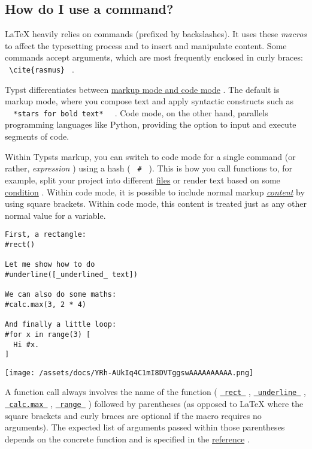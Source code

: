 \subsection{How do I use a command?}\label{commands}

LaTeX heavily relies on commands (prefixed by backslashes). It uses
these \emph{macros} to affect the typesetting process and to insert and
manipulate content. Some commands accept arguments, which are most
frequently enclosed in curly braces:
\texttt{\ \textbackslash{}cite\{rasmus\}\ } .

Typst differentiates between
\href{/docs/reference/scripting/\#blocks}{markup mode and code mode} .
The default is markup mode, where you compose text and apply syntactic
constructs such as
\texttt{\ }{\texttt{\ *stars\ for\ bold\ text*\ }}\texttt{\ } . Code
mode, on the other hand, parallels programming languages like Python,
providing the option to input and execute segments of code.

Within Typst\textquotesingle s markup, you can switch to code mode for a
single command (or rather, \emph{expression} ) using a hash (
\texttt{\ \#\ } ). This is how you call functions to, for example, split
your project into different
\href{/docs/reference/scripting/\#modules}{files} or render text based
on some \href{/docs/reference/scripting/\#conditionals}{condition} .
Within code mode, it is possible to include normal markup
\href{/docs/reference/foundations/content/}{\emph{content}} by using
square brackets. Within code mode, this content is treated just as any
other normal value for a variable.

\begin{verbatim}
First, a rectangle:
#rect()

Let me show how to do
#underline([_underlined_ text])

We can also do some maths:
#calc.max(3, 2 * 4)

And finally a little loop:
#for x in range(3) [
  Hi #x.
]
\end{verbatim}

\texttt{[image: /assets/docs/YRh-AUkIq4C1mI8DVTggswAAAAAAAAAA.png]}

A function call always involves the name of the function (
\href{/docs/reference/visualize/rect/}{\texttt{\ rect\ }} ,
\href{/docs/reference/text/underline/}{\texttt{\ underline\ }} ,
\href{/docs/reference/foundations/calc/\#functions-max}{\texttt{\ calc.max\ }}
,
\href{/docs/reference/foundations/array/\#definitions-range}{\texttt{\ range\ }}
) followed by parentheses (as opposed to LaTeX where the square brackets
and curly braces are optional if the macro requires no arguments). The
expected list of arguments passed within those parentheses depends on
the concrete function and is specified in the
\href{/docs/reference/}{reference} .

